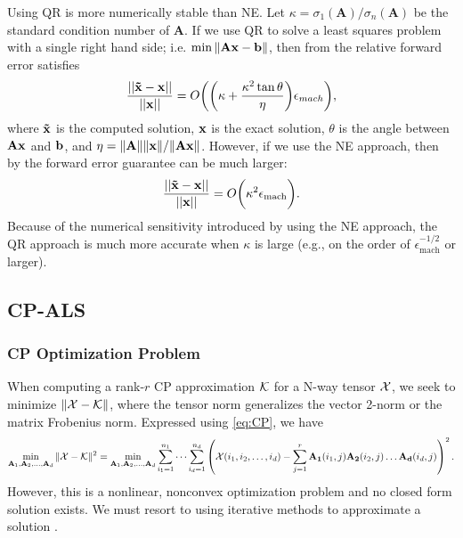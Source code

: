 \documentclass{article}
\newcommand{\mat}[1]{\mathbf{#1}}
\newcommand{\V}[2][]{\bm{#1{\mathbf{\MakeLowercase{#2}}}}} 		%
\newcommand{\T}[2][]{#1{\mathbf{\cal{#2}}}} 						%
\begin{document}
Using QR is more numerically stable than NE. 
Let $\kappa = \sigma_1(\mat{A})/\sigma_n(\mat{A})$ be the standard condition number of $\mat{A}$.
If we use QR to solve a least squares problem with a single right hand side; i.e. $\min\|\mat{A}\V{x} - \V{b} \|$, then from \cite[Eq. (19.2)]{trefethen1997numerical} the relative forward error satisfies
\begin{equation}
  \frac{||\V[\tilde]{x} - \V{x}||}{||\V{x}||} = O \biggl(\biggl(\kappa + \frac{\kappa^2\tan\theta}{\eta}\biggr)\epsilon_{mach}\biggr),
\end{equation}
where $\V[\tilde]{x}$ is the computed solution, $\V{x}$ is the exact solution, $\theta$ is the angle between $\mat{A}\V{x}$ and $\V{b}$, and $\eta = \|\mat{A}\|\|\V{x}\|/\|\mat{A}\V{x}\|$.
However, if we use the NE approach, then by \cite[Eq. (19.3)]{trefethen1997numerical} the forward error guarantee can be much larger: 
\begin{equation}
  \frac{||\V[\tilde]{x} - \V{x}||}{||\V{x}||} = O \biggl(\kappa^2 \epsilon_{\text{mach}}\biggr).
\end{equation}
Because of the numerical sensitivity introduced by using the NE approach, the QR approach is much more accurate when $\kappa$ is large (e.g., on the order of $\epsilon_{\text{mach}}^{-1/2}$ or larger).


\subsection{CP-ALS} \label{sec:cp-als}

\subsubsection{CP Optimization Problem}

When computing a rank-$r$ CP approximation $\T{K}$ for a N-way tensor $\T{X}$, we seek to minimize $\| \T{X} - \T{K} \|$, where the tensor norm generalizes the vector 2-norm or the matrix Frobenius norm.
Expressed using \cref{eq:CP}, we have  
$$\min_{\mat{A}_1,\mat{A}_2, \dots,\mat{A}_d} \| \T{X} - \T{K} \|^2 = \min_{\mat{A}_1,\mat{A}_2, \dots,\mat{A}_d} \sum_{i_1=1}^{n_1} \cdots \sum_{i_d=1}^{n_d} \left(\T{X}(i_1,i_2,\dots, i_d) - \sum^{r}_{j=1} \mat{A_1}(i_1,j)\mat{A_2}(i_2,j) \dots \mat{A_d}(i_d,j) \right)^2. $$
However, this is a nonlinear, nonconvex optimization problem and no closed form solution exists. 
We must resort to using iterative methods to approximate a solution \cite{kolda2009tensor}.
\end{document}
